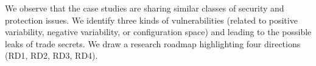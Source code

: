 
%




We observe that the case studies are sharing similar classes of security and protection issues.
We identify three kinds of vulnerabilities (related to positive variability, negative variability, or configuration space) and leading to the possible leaks of trade secrets. 
We draw a research roadmap highlighting four directions (RD1, RD2, RD3, RD4).

